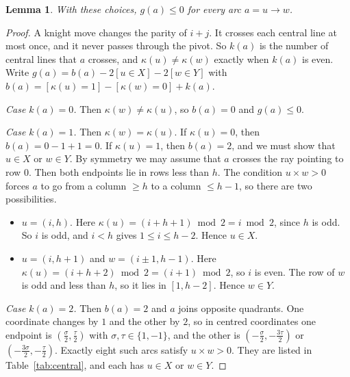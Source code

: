 \documentclass[11pt]{amsart}
\newtheorem{lemma}[theorem]{Lemma}
\theoremstyle{remark}
\begin{document}
\begin{lemma}\label{lem:even}
With these choices, $g(a)\le0$ for every arc $a=u\to w$.
\end{lemma}
\begin{proof}
A knight move changes the parity of $i+j$. It crosses each central line at most once, and it never passes through the
pivot. So $k(a)$ is the number of central lines that $a$ crosses, and $\kappa(u)\ne\kappa(w)$ exactly when $k(a)$ is
even. Write $g(a)=b(a)-2[u\in X]-2[w\in Y]$ with $b(a)=[\kappa(u)=1]-[\kappa(w)=0]+k(a)$.

\emph{Case $k(a)=0$.} Then $\kappa(w)\ne\kappa(u)$, so $b(a)=0$ and $g(a)\le0$.

\emph{Case $k(a)=1$.} Then $\kappa(w)=\kappa(u)$. If $\kappa(u)=0$, then $b(a)=0-1+1=0$. If $\kappa(u)=1$, then
$b(a)=2$, and we must show that $u\in X$ or $w\in Y$. By symmetry we may assume that $a$ crosses the ray pointing to
row $0$. Then both endpoints lie in rows less than $h$. The condition $u\times w>0$ forces $a$ to go from a column
$\ge h$ to a column $\le h-1$, so there are two possibilities.
\begin{itemize}
\item $u=(i,h)$. Here $\kappa(u)=(i+h+1)\bmod2=i\bmod2$, since $h$ is odd. So $i$ is odd, and $i<h$ gives
$1\le i\le h-2$. Hence $u\in X$.
\item $u=(i,h+1)$ and $w=(i\pm1,h-1)$. Here $\kappa(u)=(i+h+2)\bmod 2=(i+1)\bmod 2$, so $i$ is even. The row of $w$ is
odd and less than $h$, so it lies in $[1,h-2]$. Hence $w\in Y$.
\end{itemize}

\emph{Case $k(a)=2$.} Then $b(a)=2$ and $a$ joins opposite quadrants. One coordinate changes by $1$ and the other by
$2$, so in centred coordinates one endpoint is $(\frac\sigma2,\frac\tau2)$ with $\sigma,\tau\in\{1,-1\}$, and the
other is $(-\frac\sigma2,-\frac{3\tau}2)$ or $(-\frac{3\sigma}2,-\frac\tau2)$. Exactly eight such arcs satisfy $u\times w>0$. They are listed in Table~\ref{tab:central},
and each has $u\in X$ or $w\in Y$.
\end{proof}
\end{document}
